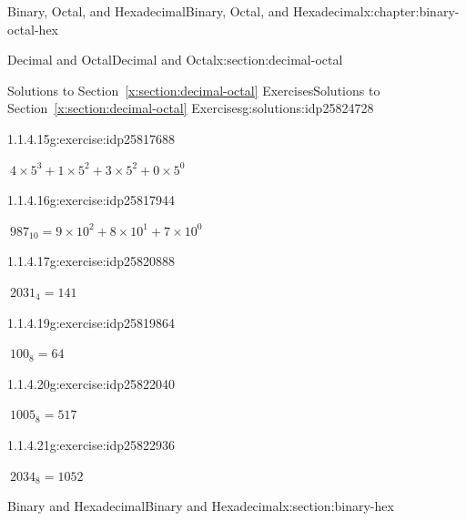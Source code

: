 \documentclass[twoside,10pt,]{book}
\newcommand{\xreffont}{\relax}
\numberwithin{equation}{section}
\begin{document}
\begin{chapterptx}{Binary, Octal, and Hexadecimal}{}{Binary, Octal, and Hexadecimal}{}{}{x:chapter:binary-octal-hex}
\begin{sectionptx}{Decimal and Octal}{}{Decimal and Octal}{}{}{x:section:decimal-octal}
\begin{solutions-subsection}{Solutions to Section~{\xreffont\ref*{x:section:decimal-octal}} Exercises}{}{Solutions to Section~{\xreffont\ref*{x:section:decimal-octal}} Exercises}{}{}{g:solutions:idp25824728}
\begin{exercisegroup}
\begin{divisionsolutioneg}{1.1.4.15}{}{g:exercise:idp25817688}%
\par\smallskip%
\noindent\hypertarget{g:solution:idp25819352-main}{}\(\ 4\times5^3+1\times5^2+3\times5^2+0\times5^0\)\end{divisionsolutioneg}%
\begin{divisionsolutioneg}{1.1.4.16}{}{g:exercise:idp25817944}%
\par\smallskip%
\noindent\hypertarget{g:solution:idp25813976-main}{}\(\ 987_{10}=9\times10^2+8\times10^1+7\times10^0\)\end{divisionsolutioneg}%
\end{exercisegroup}
\par\medskip\noindent
\begin{exercisegroup}
\begin{divisionsolutioneg}{1.1.4.17}{}{g:exercise:idp25820888}%
\par\smallskip%
\noindent\hypertarget{g:solution:idp25823576-main}{}\(\ 2031_4=141\)\end{divisionsolutioneg}%
\begin{divisionsolutioneg}{1.1.4.19}{}{g:exercise:idp25819864}%
\par\smallskip%
\noindent\hypertarget{g:solution:idp25824984-main}{}\(\ 100_8=64\)\end{divisionsolutioneg}%
\begin{divisionsolutioneg}{1.1.4.20}{}{g:exercise:idp25822040}%
\par\smallskip%
\noindent\hypertarget{g:solution:idp25822168-main}{}\(\ 1005_8=517\)\end{divisionsolutioneg}%
\begin{divisionsolutioneg}{1.1.4.21}{}{g:exercise:idp25822936}%
\par\smallskip%
\noindent\hypertarget{g:solution:idp25824088-main}{}\(\ 2034_8=1052\)\end{divisionsolutioneg}%
\end{exercisegroup}
\par\medskip\noindent
\end{solutions-subsection}
\end{sectionptx}
%
%
\typeout{************************************************}
\typeout{************************************************}
%
\begin{sectionptx}{Binary and Hexadecimal}{}{Binary and Hexadecimal}{}{}{x:section:binary-hex}
%
%
\typeout{************************************************}

\end{sectionptx}
\end{chapterptx}
\end{document}
